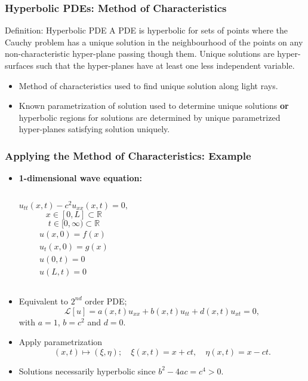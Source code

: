 \documentclass{beamer}
\begin{document}
\begin{frame}
\frametitle{\textbf{Hyperbolic PDEs:} Method of Characteristics}
\begin{block}{Definition: Hyperbolic PDE}
A PDE is hyperbolic for sets of points where the Cauchy problem has a unique solution in the neighbourhood of the points on any non-characteristic hyper-plane passing though them. Unique solutions are hyper-surfaces such that the hyper-planes have at least one less independent variable.
\end{block}
\begin{itemize}
\item Method of characteristics used to find unique solution along light rays.
\item Known parametrization of solution used to determine unique solutions \textbf{or} hyperbolic regions for solutions are determined by unique parametrized hyper-planes satisfying solution uniquely.
\end{itemize}
\end{frame}

\begin{frame}
\frametitle{\textbf{Applying the Method of Characteristics:} Example}
\begin{itemize}
\item \textbf{1-dimensional wave equation:}
\begin{columns}
$$u_{tt}(x,t)-c^2u_{xx}(x,t)=0,$$ $$x\in[0,L]\subset\mathbb{R}$$ $$t\in[0,\infty)\subset\mathbb{R}$$
\begin{gather}
u(x,0)=f(x)\nonumber\\
u_t(x,0)=g(x)\nonumber\\
u(0,t)=0\nonumber\\
u(L,t)=0\nonumber
\end{gather}
\end{columns}
\item Equivalent to $2^{nd}$ order PDE; $$\mathcal{L}[u]=a(x,t)u_{xx}+b(x,t)u_{tt}+d(x,t)u_{xt}=0,$$ with $a=1$, $b=c^2$ and $d=0$.
\item Apply parametrization $$(x,t)\mapsto(\xi,\eta);\quad\xi(x,t)=x+ct,\quad \eta(x,t)=x-ct.$$
\item Solutions necessarily hyperbolic since $b^2-4ac=c^4>0$.
\end{itemize}
\end{frame}
\end{document}
